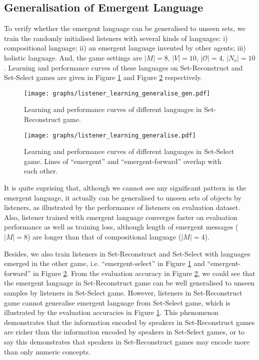 \subsection{Generalisation of Emergent Language}
\label{ssec4.2.4:emergent_lan_generalise}

To verify whether the emergent language can be generalised to unseen sets, we train the randomly initialised listeners with several kinds of languages: i) compositional language; ii) an emergent language invented by other agents; iii) holistic language. And, the game settings are $|M|=8$, $|V|=10$, $|\mathcal{O}|=4$, $|N_{o}|=10$. Learning and performance curves of these languages on Set-Reconstruct and Set-Select games are given in  Figure \ref{fig4.0:listener_learning_generalise_gen} and Figure \ref{fig4.00:listener_learning_generalise_ref} respectively.

\begin{figure}[!h]
    \centering
    \texttt{[image: graphs/listener\_learning\_generalise\_gen.pdf]}
    \caption{Learning and performance curves of different languages in Set-Reconstruct game.}
    \label{fig4.0:listener_learning_generalise_gen}
\end{figure}

\begin{figure}[!h]
    \centering
    \texttt{[image: graphs/listener\_learning\_generalise.pdf]}
    \caption{Learning and performance curves of different languages in Set-Select game. Lines of ``emergent'' and ``emergent-forward'' overlap with each other.}
    \label{fig4.00:listener_learning_generalise_ref}
\end{figure}

It is quite suprising that, although we cannot see any significant pattern in the emergent language, it actually can be generalised to unseen sets of objects by listeners, as illustrated by the performance of listeners on evaluation dataset. Also, listener trained with emergent language converges faster on evaluation performance as well as training loss, although length of emergent messages ($|M|=8$) are longer than that of compositional language ($|M|=4$).

Besides, we also train listeners in Set-Reconstruct and Set-Select with languages emerged in the other game, i.e. ``emergent-select'' in Figure \ref{fig4.0:listener_learning_generalise_gen} and ``emergent-forward'' in Figure \ref{fig4.00:listener_learning_generalise_ref}. From the evaluation accuracy in Figure \ref{fig4.00:listener_learning_generalise_ref}, we could see that the emergent language in Set-Reconstruct game can be well generalised to unseen samples by listeners in Set-Select game. However, listeners in Set-Reconstruct game cannot generalise emergent language from Set-Select game, which is illustrated by the evaluation accuracies in Figure \ref{fig4.0:listener_learning_generalise_gen}. This phenomenon demonstrates that the information encoded by speakers in Set-Reconstruct games are richer than the information encoded by speakers in Set-Select games, or to say this demonstrates that speakers in Set-Reconstruct games may encode more than only numeric concepts.

